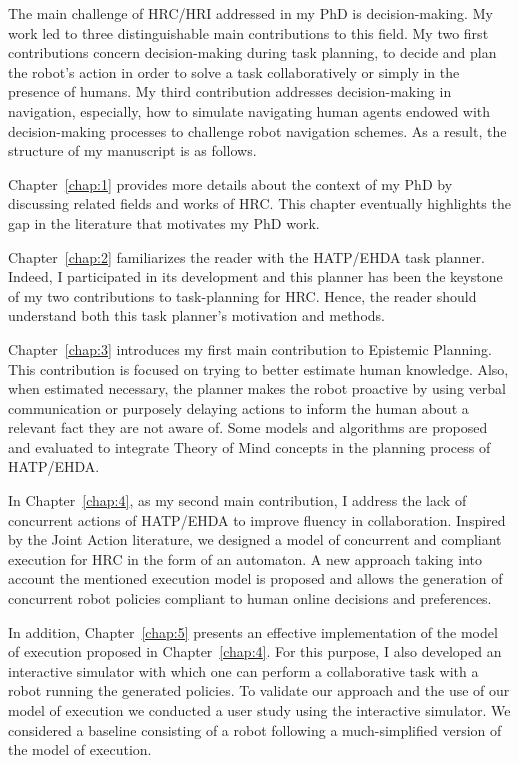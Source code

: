 
The main challenge of HRC/HRI addressed in my PhD is decision-making. My work led to three distinguishable main contributions to this field. My two first contributions concern decision-making during task planning, to decide and plan the robot's action in order to solve a task collaboratively or simply in the presence of humans. My third contribution addresses decision-making in navigation, especially, how to simulate navigating human agents endowed with decision-making processes to challenge robot navigation schemes. 
As a result, the structure of my manuscript is as follows.

Chapter~\ref{chap:1} provides more details about the context of my PhD by discussing related fields and works of HRC. This chapter eventually highlights the gap in the literature that motivates my PhD work.

Chapter~\ref{chap:2} familiarizes the reader with the HATP/EHDA task planner. Indeed, I participated in its development and this planner has been the keystone of my two contributions to task-planning for HRC. Hence, the reader should understand both this task planner's motivation and methods.

Chapter~\ref{chap:3} introduces my first main contribution to Epistemic Planning. This contribution is focused on trying to better estimate human knowledge. Also, when estimated necessary, the planner makes the robot proactive by using verbal communication or purposely delaying actions to inform the human about a relevant fact they are not aware of. Some models and algorithms are proposed and evaluated to integrate Theory of Mind concepts in the planning process of HATP/EHDA.

In Chapter~\ref{chap:4}, as my second main contribution, I address the lack of concurrent actions of HATP/EHDA to improve fluency in collaboration. Inspired by the Joint Action literature, we designed a model of concurrent and compliant execution for HRC in the form of an automaton. A new approach taking into account the mentioned execution model is proposed and allows the generation of concurrent robot policies compliant to human online decisions and preferences. 

In addition, Chapter~\ref{chap:5} presents an effective implementation of the model of execution proposed in Chapter~\ref{chap:4}. For this purpose, I also developed an interactive simulator with which one can perform a collaborative task with a robot running the generated policies. To validate our approach and the use of our model of execution we conducted a user study using the interactive simulator. We considered a baseline consisting of a robot following a much-simplified version of the model of execution.

